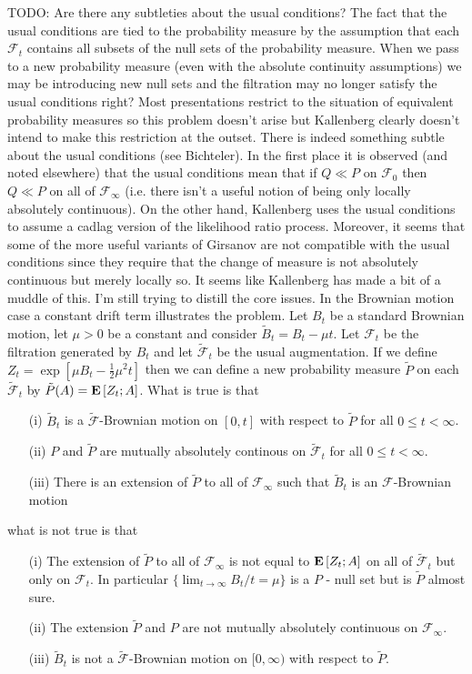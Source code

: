 TODO:  Are there any subtleties about the usual conditions?  The fact that the usual conditions are tied to the probability measure by the assumption that each $\mathcal{F}_t$ contains all subsets of the null sets of the probability measure.  When we pass to a new probability measure (even with the absolute continuity assumptions) we may be introducing new null sets and the filtration may no longer satisfy the usual conditions right?  Most presentations restrict to the situation of equivalent probability measures so this problem doesn't arise but Kallenberg clearly doesn't intend to make this restriction at the outset.  There is indeed something subtle about the usual conditions (see Bichteler).  In the first place it is observed (and noted elsewhere) that the usual conditions mean that if $Q \ll P$ on $\mathcal{F}_0$ then $Q \ll P$ on all of $\mathcal{F}_\infty$ (i.e. there isn't a useful notion of being only locally absolutely continuous).  On the other hand, Kallenberg uses the usual conditions to assume a cadlag version of the likelihood ratio process.  Moreover, it seems that some of the more useful variants of Girsanov are not compatible with the usual conditions since they require that the change of measure is not absolutely continuous but merely locally so.  It seems like Kallenberg has made a bit of a muddle of this.  I'm still trying to distill the core issues.  In the Brownian motion case a constant drift term illustrates the problem.  Let $B_t$ be a standard Brownian motion, let $\mu > 0$ be a constant and consider $\tilde{B}_t = B_t - \mu t$.  Let $\mathcal{F}_t$ be the filtration generated by $B_t$ and let $\tilde{\mathcal{F}}_t$ be the usual augmentation.  If we define $Z_t = \exp\left [ \mu B_t - \frac{1}{2} \mu^2 t\right]$ then we can define a new probability measure $\tilde{P}$ on each $\tilde{\mathcal{F}}_t$ by $\tilde{P}(A) = \textbf{E}\left[Z_t ; A\right]$.  What is true is that
\begin{itemize}
\item[(i)]$\tilde{B}_t$ is a $\tilde{\mathcal{F}}$-Brownian motion on $[0,t]$ with respect to $\tilde{P}$ for all $0 \leq t < \infty$.
\item[(ii)]$P$ and $\tilde{P}$ are mutually absolutely continous on $\tilde{\mathcal{F}}_t$ for all $0 \leq t < \infty$.
\item[(iii)]There is an extension of $\tilde{P}$ to all of $\mathcal{F}_\infty$ such that $\tilde{B}_t$ is an $\mathcal{F}$-Brownian motion
\end{itemize}
what is not true is that
\begin{itemize}
\item[(i)]The extension of $\tilde{P}$ to all of $\mathcal{F}_\infty$ is not equal to $\textbf{E}\left[Z_t; A\right]$ on all of $\tilde{\mathcal{F}}_t$ but only on $\mathcal{F}_t$.  In particular $\lbrace \lim_{t \to \infty} B_t/t = \mu \rbrace$ is a $P$ - null set but is $\tilde{P}$ almost sure.
\item[(ii)]The extension $\tilde{P}$ and $P$ are not mutually absolutely continuous on $\mathcal{F}_\infty$.
\item[(iii)]$\tilde{B}_t$ is not a $\tilde{\mathcal{F}}$-Brownian motion on $[0,\infty)$ with respect to $\tilde{P}$. 
\end{itemize}

